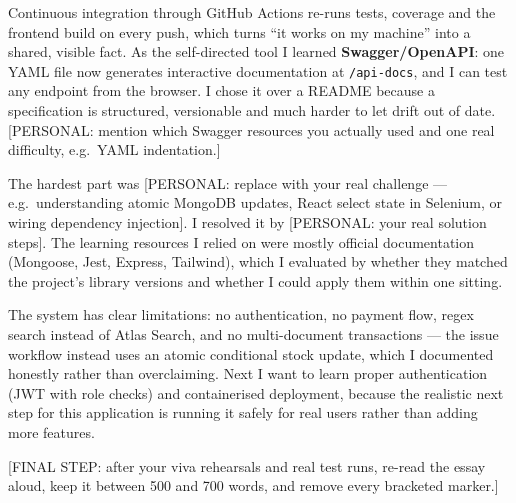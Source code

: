 Continuous integration through GitHub Actions re-runs tests, coverage and
the frontend build on every push, which turns ``it works on my machine''
into a shared, visible fact. As the self-directed tool I learned
\textbf{Swagger/OpenAPI}: one YAML file now generates interactive
documentation at \texttt{/api-docs}, and I can test any endpoint from the
browser. I chose it over a README because a specification is structured,
versionable and much harder to let drift out of date.
[PERSONAL: mention which Swagger resources you actually used and one real
difficulty, e.g.\ YAML indentation.]

The hardest part was [PERSONAL: replace with your real challenge --- e.g.\
understanding atomic MongoDB updates, React select state in Selenium, or
wiring dependency injection]. I resolved it by [PERSONAL: your real solution
steps]. The learning resources I relied on were mostly official
documentation (Mongoose, Jest, Express, Tailwind), which I evaluated by
whether they matched the project's library versions and whether I could
apply them within one sitting.

The system has clear limitations: no authentication, no payment flow, regex
search instead of Atlas Search, and no multi-document transactions --- the
issue workflow instead uses an atomic conditional stock update, which I
documented honestly rather than overclaiming. Next I want to learn proper
authentication (JWT with role checks) and containerised deployment, because
the realistic next step for this application is running it safely for real
users rather than adding more features.

[FINAL STEP: after your viva rehearsals and real test runs, re-read the
essay aloud, keep it between 500 and 700 words, and remove every bracketed
marker.]

